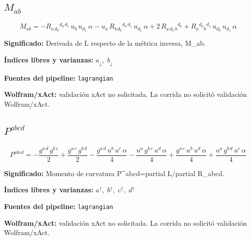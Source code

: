 \documentclass[11pt]{article}
\begin{document}
\subsection*{$ M_{ab} $}
\begin{dmath*}[breakdepth={5}]
M_{ab} = -R{}_{a\,d_{0}}{}^{d_{0}\,d_{1}}\,u{}_{b}\,u{}_{d_{1}}\,\alpha - u{}_{a}\,R{}_{b\,d_{0}}{}^{d_{0}\,d_{1}}\,u{}_{d_{1}}\,\alpha + 2\,R{}_{a\,d_{0}\,b}{}^{d_{0}} + R{}_{a}{}^{d_{0}}{}_{b}{}^{d_{1}}\,u{}_{d_{0}}\,u{}_{d_{1}}\,\alpha
\end{dmath*}
\par\vspace{1.2\baselineskip}\noindent
\begin{minipage}{\linewidth}
\textbf{Significado:} Derivada de L respecto de la métrica inversa, M\_ab.\par
\textbf{Índices libres y varianzas:} $ a_{\downarrow},\;b_{\downarrow} $\par
\textbf{Fuentes del pipeline:} \texttt{lagrangian}\par
\textbf{Wolfram/xAct:} validación xAct no solicitada. La corrida no solicitó validación Wolfram/xAct.\par
\end{minipage}
\subsection*{$ P^{abcd} $}
\begin{dmath*}[breakdepth={5}]
P^{abcd} = -\frac{g{}^{a\,d}\,g{}^{b\,c}}{2} + \frac{g{}^{a\,c}\,g{}^{b\,d}}{2} - \frac{g{}^{a\,d}\,u{}^{b}\,u{}^{c}\,\alpha}{4} - \frac{u{}^{a}\,g{}^{b\,c}\,u{}^{d}\,\alpha}{4} + \frac{g{}^{a\,c}\,u{}^{b}\,u{}^{d}\,\alpha}{4} + \frac{u{}^{a}\,g{}^{b\,d}\,u{}^{c}\,\alpha}{4}
\end{dmath*}
\par\vspace{1.2\baselineskip}\noindent
\begin{minipage}{\linewidth}
\textbf{Significado:} Momento de curvatura P^{abcd}=partial L/partial R\_abcd.\par
\textbf{Índices libres y varianzas:} $ a^{\uparrow},\;b^{\uparrow},\;c^{\uparrow},\;d^{\uparrow} $\par
\textbf{Fuentes del pipeline:} \texttt{lagrangian}\par
\textbf{Wolfram/xAct:} validación xAct no solicitada. La corrida no solicitó validación Wolfram/xAct.\par
\end{minipage}
\end{document}
